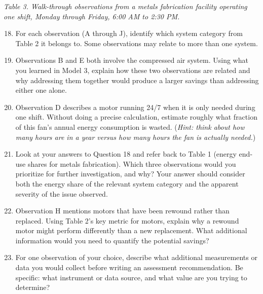 \documentclass[./main.tex]{subfiles}
\begin{document}
\emph{Table 3. Walk-through observations from a metals fabrication facility
operating one shift, Monday through Friday, 6:00 AM to 2:30 PM.}

\begin{enumerate}
  \setcounter{enumi}{17}
  \item For each observation (A through J), identify which system category from
        Table 2 it belongs to. Some observations may relate to more than one
        system.
        \vspace{1.25in}

  \item Observations B and E both involve the compressed air system. Using what
        you learned in Model 3, explain how these two observations are related
        and why addressing them together would produce a larger savings than
        addressing either one alone.
        \vspace{1.25in}

  \item Observation D describes a motor running 24/7 when it is only needed
        during one shift. Without doing a precise calculation, estimate roughly
        what fraction of this fan's annual energy consumption is wasted.
        (\emph{Hint: think about how many hours are in a year versus how many
        hours the fan is actually needed.})
        \vspace{1.25in}

  \item Look at your answers to Question 18 and refer back to Table 1 (energy
        end-use shares for metals fabrication). Which three observations would
        you prioritize for further investigation, and why? Your answer should
        consider both the energy share of the relevant system category and the
        apparent severity of the issue observed.
        \vspace{1.25in}

  \item Observation H mentions motors that have been rewound rather than
        replaced. Using Table 2's key metric for motors, explain why a rewound
        motor might perform differently than a new replacement. What additional
        information would you need to quantify the potential savings?
        \vspace{1.25in}

  \item For one observation of your choice, describe what additional
        measurements or data you would collect before writing an assessment
        recommendation. Be specific: what instrument or data source, and what
        value are you trying to determine?
        \vspace{1.25in}
\end{enumerate}
\end{document}
